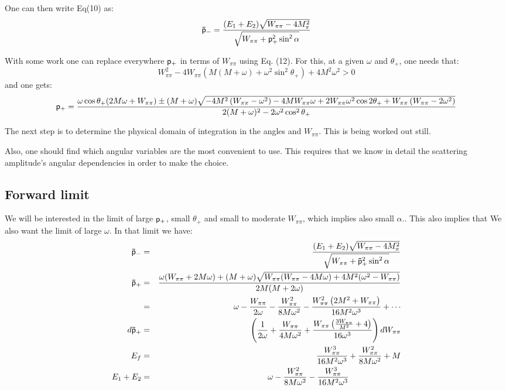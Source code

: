 \documentclass[12pt,epsfig]{article}
\newcommand{\beq}{\begin{equation}}
\newcommand{\eeq}{\end{equation}}
\newcommand{\bea}{\begin{eqnarray}}
\newcommand{\eea}{\end{eqnarray}}
\begin{document}
  One can then write Eq(10) as:
   \beq
{ \sf{\bar p}}_-=\frac{(E_1+E_2) \sqrt{W_{\pi\pi}-4M_\pi^2}}{  \sqrt{W_{\pi\pi}+\sf{p}_+^2\sin^2\alpha}}
  \eeq
  
  
  
   With some work one can replace everywhere ${ \sf{ p}}_+ $ in terms of $W_{\pi\pi}$ using Eq. (12). For this, at a given $\omega$ and $\theta_+$,  one needs that:
   \beq
   W_{\pi\pi}^2- 4 W_{\pi\pi}  (M(M+\omega)+\omega^2 \sin^2\theta_+)
   +4 M^2 \omega^2>0
   \eeq
 and one gets:
 {\footnotesize
 \beq
{ \sf{ p}}_+  =\frac{\omega  \cos
   \theta_+ (2 M \omega +W_{\pi\pi})\pm (M+\omega ) \sqrt{ -4 M^2 \left(W_{\pi\pi}-\omega ^2\right)-4 M W_{\pi\pi} \omega +2 W_{\pi\pi} \omega ^2 \cos 2 \theta_++W_{\pi\pi} \left(W_{\pi\pi}-2 \omega ^2\right)}}{2 (M+\omega )^2-2 \omega ^2 \cos ^2\theta_+}
 \eeq}
  
  The next step is to determine the physical  domain of integration in the angles and $W_{\pi\pi}$. This is being worked out still.
  
  Also, one should find which angular variables are the most convenient to use. This requires that we know in detail the scattering amplitude's angular dependencies in order to make the choice.
  
 \subsection{Forward limit}
 We will be interested in the limit of large ${ \sf{ p}}_+$, small $\theta_+$ and small to moderate $W_{\pi\pi}$, which implies also small $\alpha$.. This also implies that We also want the limit of large $\omega$.
  In that limit we have:
  \bea
    { \sf{\bar p}}_-&=&\frac{(E_1+E_2) \sqrt{W_{\pi\pi}-4M_\pi^2}}{  \sqrt{W_{\pi\pi}+{ \sf{\bar p}}_+^2 \sin^2\alpha}}\nonumber\\
{ \sf{\bar p}}_+&=&\frac{\omega(W_{\pi\pi}+2 M \omega)+(M+\omega)\sqrt{W_{\pi\pi}(W_{\pi\pi}-4 M \omega)+4 M^2(\omega^2-W_{\pi\pi})}}{2 M(M+2\omega)}\nonumber\\
&=&\omega- \frac{W_{\pi\pi}}{2 \omega
   } -\frac{W_{\pi\pi}^2}{8 M \omega^2}-\frac{W_{\pi\pi}^2 \left(2 M^2+W_{\pi\pi}\right)}{16 M^2 \omega ^3}+\cdots\nonumber\\
d{ \sf{\bar p}}_+&=&\left(\frac{1}{2
   \omega } +\frac{W_{\pi\pi}}{4 M \omega ^2}+ \frac{W_{\pi\pi} \left(\frac{3 W_{\pi\pi}}{M^2}+4\right)}{16 \omega ^3}\right) dW_{\pi\pi}\nonumber\\
E_f&=& \frac{W_{\pi\pi}^3}{16 M^2 \omega ^3}+\frac{W_{\pi\pi}^2}{8 M \omega ^2}+M\nonumber\\
E_1+E_2&=& \omega- \frac{W_{\pi\pi}^2}{8 M \omega ^2}-\frac{W_{\pi\pi}^3  }{16 M^2 \omega ^3}~~~~~~~~~~~~~~~~~~~
  \eea
  
\end{document}
